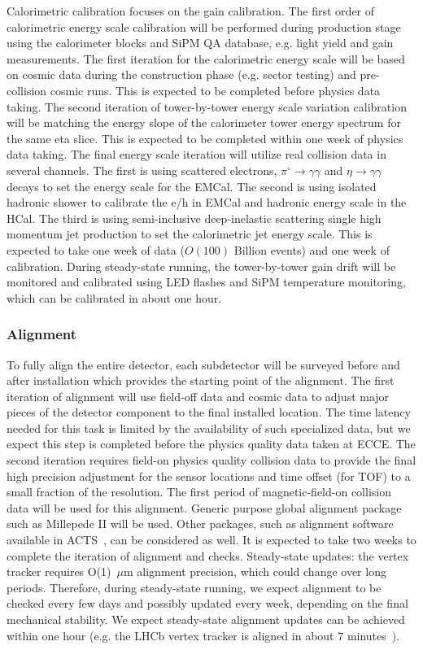  Calorimetric calibration focuses on the gain calibration. The first order of calorimetric energy scale calibration will be performed during production stage using the calorimeter blocks and SiPM QA database, e.g. light yield and gain measurements. The first iteration for the calorimetric energy scale will be based on cosmic data during the construction phase (e.g. sector testing) and pre-collision cosmic runs. This is expected to be completed before physics data taking. The second iteration of tower-by-tower energy scale variation calibration will be matching the energy slope of the calorimeter tower energy spectrum for the same eta slice. This is expected to be completed within one week of physics data taking. The final energy scale iteration will utilize real collision data in several channels. The first is using scattered electrons, $\pi^{\circ}\rightarrow\gamma\gamma$ and $\eta\rightarrow\gamma\gamma$ decays to set the energy scale for the EMCal. The second is using isolated hadronic shower to calibrate the e/h in EMCal and hadronic energy scale in the HCal. The third is using semi-inclusive deep-inelastic scattering single high momentum jet production to set the calorimetric jet energy scale. This is expected to take one week of data ($O(100)$ Billion events) and one week of calibration. During steady-state running, the tower-by-tower gain drift will be monitored and calibrated using LED flashes and SiPM temperature monitoring, which can be calibrated in about one hour. 


\subsubsection{Alignment}

To fully align the entire detector, each subdetector will be surveyed before and after installation which provides the starting point of the alignment. The first iteration of alignment will use field-off data and cosmic data to adjust major pieces of the detector component to the final installed location. The time latency needed for this task is limited by the availability of such specialized data, but we expect this step is completed before the physics quality data taken at ECCE. The second iteration requires field-on physics quality collision data to provide the final high precision adjustment for the sensor locations and time offset (for TOF) to a small fraction of the resolution. The first period of magnetic-field-on collision data will be used for this alignment. Generic purpose global alignment package such as Millepede II will be used. Other packages, such as alignment software available in ACTS~\cite{Ai:2021ghi}, can be considered as well. It is expected to take two weeks to complete the iteration of alignment and checks. Steady-state updates: the vertex tracker requires O(1)~$\mu$m alignment precision, which could change over long periods. Therefore, during steady-state running, we expect alignment to be checked every few days and possibly updated every week, depending on the final mechanical stability. We expect steady-state alignment updates can be achieved within one hour (e.g. the LHCb vertex tracker is aligned in about 7 minutes~\cite{BORGHI2017560}). 


